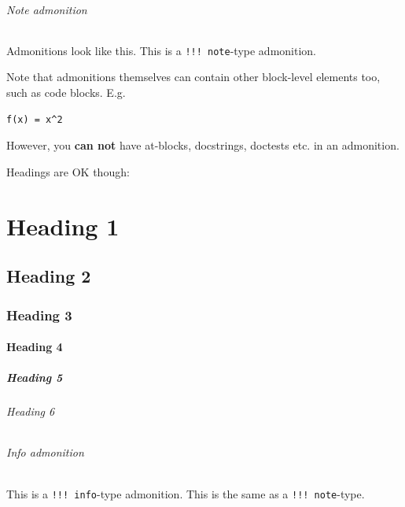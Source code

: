 \subparagraph{Note admonition}\indent



\label{3427999462323267970}{}


\begin{tcolorbox}[toptitle=-1mm,bottomtitle=1mm,colback=admonition-note!50!white,colframe=admonition-note,title=\textbf{{\textquotesingle}note{\textquotesingle} admonition}]
Admonitions look like this. This is a \texttt{!!! note}-type admonition.

Note that admonitions themselves can contain other block-level elements too, such as code blocks. E.g.


\begin{verbatim}
f(x) = x^2
\end{verbatim}

However, you \textbf{can not} have at-blocks, docstrings, doctests etc. in an admonition.

Headings are OK though:

\chapter{Heading 1}

\section{Heading 2}

\subsection{Heading 3}

\subsubsection{Heading 4}

\paragraph{Heading 5}\indent

\subparagraph{Heading 6}\indent

\end{tcolorbox}


\subparagraph{Info admonition}\indent



\label{3520455154602929669}{}


\begin{tcolorbox}[toptitle=-1mm,bottomtitle=1mm,colback=admonition-info!50!white,colframe=admonition-info,title=\textbf{{\textquotesingle}info{\textquotesingle} admonition}]
This is a \texttt{!!! info}-type admonition. This is the same as a \texttt{!!! note}-type.

\end{tcolorbox}


